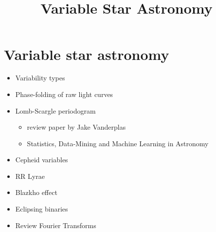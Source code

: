 \documentclass{../template/texnote}
\title{Variable Star Astronomy}
\begin{document}
    \maketitle {}
\section{Variable star astronomy}\label{variable-star-astronomy}

\begin{itemize}
\item
  Variability types
\item
  Phase-folding of raw light curves
\item
  Lomb-Scargle periodogram

  \begin{itemize}
  \tightlist
  \item
    review paper by Jake Vanderplas
  \item
    Statistics, Data-Mining and Machine Learning in Astronomy ~
  \end{itemize}
\item
  Cepheid variables
\item
  RR Lyrae
\item
  Blazkho effect
\item
  Eclipsing binaries
\item
  Review Fourier Transforms
\end{itemize}
    \printbibliography
\end{document}
